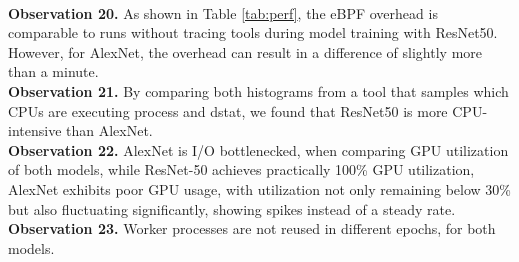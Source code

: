 \documentclass[conference]{IEEEtran}
\begin{document}
\\
\textbf{Observation 20.} As shown in Table \ref{tab:perf}, the eBPF overhead is comparable to runs without tracing tools during model training with ResNet50. However, for AlexNet, the overhead can result in a difference of slightly more than a minute.
\\
\textbf{Observation 21.} By comparing both histograms from a tool that samples which CPUs are executing process and dstat, we found that ResNet50 is more CPU-intensive than AlexNet.
\\
\textbf{Observation 22.} AlexNet is I/O bottlenecked, when comparing GPU utilization of both models, while ResNet-50 achieves practically 100\% GPU utilization, AlexNet exhibits poor GPU usage, with utilization not only remaining below 30\% but also fluctuating significantly, showing spikes instead of a steady rate. 
\\
\textbf{Observation 23.} Worker processes are not reused in different epochs, for both models.


\end{document}
